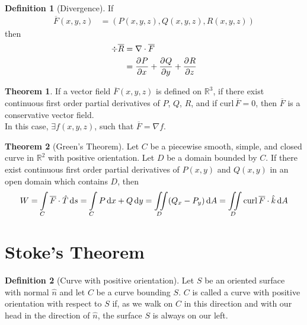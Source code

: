 \documentclass[fleqn, a4paper, 12pt, twoside]{article}
\theoremstyle{definition}
\newtheorem{definition}{Definition}
\theoremstyle{theorem}
\newtheorem{theorem}{Theorem}
\newcommand{\curl}{\mathrm{curl\,}}
\begin{document}
{\begin{definition}[Divergence]
	If
	\begin{align*}
		\overline{F}(x,y,z) & = \left( P(x,y,z) , Q(x,y,z) , R(x,y,z) \right)
	\end{align*}
	then
	\begin{align*}
		\div \overline{R} & = \nabla \cdot \overline{F} \\
                                  & = \dpd{P}{x} + \dpd{Q}{y} + \dpd{R}{z}
	\end{align*}
\end{definition}

\begin{theorem}
	If a vector field $\overline{F}(x,y,z)$ is defined on $\mathbb{R}^3$, if there exist continuous first order partial derivatives of $P$, $Q$, $R$, and if $\curl \overline{F} = 0$, then $\overline{F}$ is a conservative vector field.\\
	In this case, $\exists f(x,y,z)$, such that $\overline{F} = \nabla f$.
\end{theorem}

\begin{theorem}[Green's Theorem]
	Let $C$ be a piecewise smooth, simple, and closed curve in $\mathbb{R}^2$ with positive orientation.
	Let $D$ be a domain bounded by $C$.
	If there exist continuous first order partial derivatives of $P(x,y)$ and $Q(x,y)$ in an open domain which contains $D$, then
	\begin{equation*}
		W = \int\limits_{C} \overline{F} \cdot \hat{T} \dif s = \int\limits_{C} P \dif x + Q \dif y = \iint\limits_{D} (Q_x - P_y) \dif A = \iint\limits_{D} \curl \overline{F} \cdot \hat{k} \dif A
	\end{equation*}
	\label{Green's_Theorem}
\end{theorem}

\section{Stoke's Theorem}

\begin{definition}[Curve with positive orientation]
	Let $S$ be an oriented surface with normal $\hat{n}$ and let $C$ be a curve bounding $S$.
	$C$ is called a curve with positive orientation with respect to $S$ if, as we walk on $C$ in this direction and with our head in the direction of $\hat{n}$, the surface $S$ is always on our left.
\end{definition}

}
\end{document}
